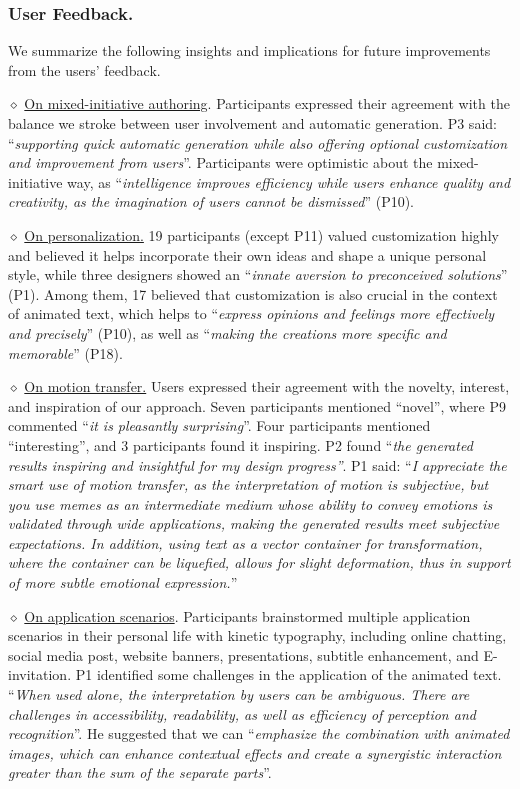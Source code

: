 \subsubsection{User Feedback.}
We summarize the following insights and implications for future improvements from the users' feedback.

$\diamond$ \underline{On mixed-initiative authoring}. Participants expressed their agreement with the balance we stroke between user involvement and automatic generation. P3 said: ``{\it supporting quick automatic generation while also offering optional customization and improvement from users}''. Participants were optimistic about the mixed-initiative way, as ``{\it intelligence improves efficiency while users enhance quality and creativity, as the imagination of users cannot be dismissed}'' (P10).

$\diamond$ \underline{On personalization.}
19 participants (except P11) valued customization highly and believed it helps incorporate their own ideas and shape a unique personal style, while three designers showed an ``{\it innate aversion to preconceived solutions}'' (P1). Among them, 17 believed that customization is also crucial in the context of animated text, which helps to ``{\it express opinions and feelings more effectively and precisely}'' (P10), as well as ``{\it making the creations more specific and memorable}'' (P18).

$\diamond$ \underline{On motion transfer.}
Users expressed their agreement with the novelty, interest, and inspiration of our approach.
Seven participants mentioned ``novel'', where P9 commented ``{\it it is pleasantly surprising}''.
Four participants mentioned ``interesting'', and 3 participants found it inspiring.
P2 found {``\it the generated results inspiring and insightful for my design progress''}.
P1 said: ``{\it I appreciate the smart use of motion transfer, as the interpretation of motion is subjective, but you use memes as an intermediate medium whose ability to convey emotions is validated through wide applications, making the generated results meet subjective expectations. In addition, using text as a vector container for transformation, where the container can be liquefied, allows for slight deformation, thus in support of more subtle emotional expression.}''

$\diamond$ \underline{On application scenarios}.
Participants brainstormed multiple application scenarios in their personal life with kinetic typography, including online chatting, social media post, website banners, presentations, subtitle enhancement, and E-invitation. 
P1 identified some challenges in the application of the animated text. ``{\it When used alone, the interpretation by users can be ambiguous. There are challenges in accessibility, readability, as well as efficiency of perception and recognition}''.
He suggested that we can ``{\it emphasize the combination with animated images, which can enhance contextual effects and create a synergistic interaction greater than the sum of the separate parts}''.

